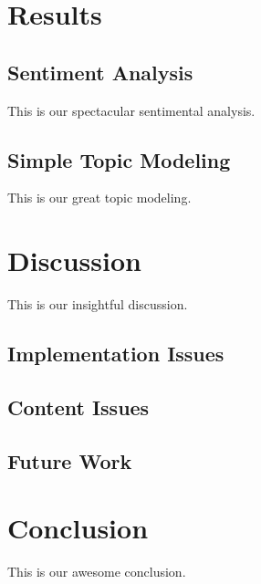\documentclass[10pt,a4paper,twocolumn]{scrartcl}
\begin{document}



\section{Results}

\subsection{Sentiment Analysis}
This is our spectacular sentimental analysis.

\subsection{Simple Topic Modeling}
This is our great topic modeling.

\section{Discussion}
This is our insightful discussion.
\subsection{Implementation Issues}

\subsection{Content Issues}

\subsection{Future Work}

\section{Conclusion}
This is our awesome conclusion.

{\footnotesize }
\end{document}
